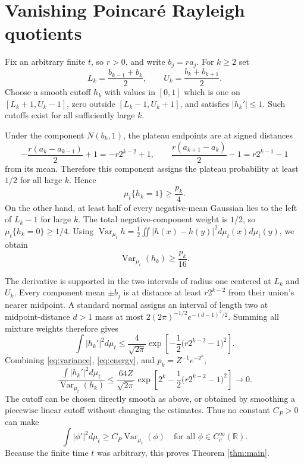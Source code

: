 \documentclass[10pt]{article}
\newcommand{\R}{\mathbb R}
\newcommand{\Var}{\operatorname{Var}}
\begin{document}
\section{Vanishing Poincar\'e Rayleigh quotients}
Fix an arbitrary finite $t$, so $r>0$, and write $b_j=ra_j$.  For $k\ge2$ set
\[
 L_k=\frac{b_{k-1}+b_k}{2},\qquad
 U_k=\frac{b_k+b_{k+1}}2.
\]
Choose a smooth cutoff $h_k$ with values in $[0,1]$ which is one on
$[L_k+1,U_k-1]$, zero outside $[L_k-1,U_k+1]$, and satisfies
$|h_k'|\le1$.  Such cutoffs exist for all sufficiently large $k$.

Under the component $N(b_k,1)$, the plateau endpoints are at signed
distances
\[
 -\frac{r(a_k-a_{k-1})}{2}+1=-r2^{k-2}+1,\qquad
 \frac{r(a_{k+1}-a_k)}2-1=r2^{k-1}-1
\]
from its mean.  Therefore this component assigns the plateau probability at
least $1/2$ for all large $k$.  Hence
\[
 \mu_t\{h_k=1\}\ge\frac{p_k}{4}.
\]
On the other hand, at least half of every negative-mean Gaussian lies to the
left of $L_k-1$ for large $k$.  The total negative-component weight is $1/2$,
so $\mu_t\{h_k=0\}\ge1/4$.  Using
$\Var_{\mu_t}h=\frac12\iint|h(x)-h(y)|^2d\mu_t(x)d\mu_t(y)$, we obtain
\begin{equation}\label{eq:variance}
 \Var_{\mu_t}(h_k)\ge\frac{p_k}{16}.
\end{equation}

The derivative is supported in the two intervals of radius one centered at
$L_k$ and $U_k$.  Every component mean $\pm b_j$ is at distance at least
$r2^{k-2}$ from their union's nearer midpoint.  A standard normal assigns an
interval of length two at midpoint-distance $d>1$ mass at most
$2(2\pi)^{-1/2}e^{-(d-1)^2/2}$.  Summing all mixture weights therefore gives
\begin{equation}\label{eq:energy}
 \int|h_k'|^2d\mu_t
 \le \frac4{\sqrt{2\pi}}
       \exp\!\left[-\frac12\bigl(r2^{k-2}-1\bigr)^2\right].
\end{equation}
Combining \eqref{eq:variance}, \eqref{eq:energy}, and
$p_k=Z^{-1}e^{-2^k}$,
\begin{equation}\label{eq:rayleigh}
 \frac{\int|h_k'|^2d\mu_t}{\Var_{\mu_t}(h_k)}
 \le \frac{64Z}{\sqrt{2\pi}}
 \exp\!\left[2^k-\frac12\bigl(r2^{k-2}-1\bigr)^2\right]
 \longrightarrow0.
\end{equation}
The cutoff can be chosen directly smooth as above, or obtained by smoothing
a piecewise linear cutoff without changing the estimates.  Thus no constant
$C_P>0$ can make
\[
 \int|\phi'|^2d\mu_t\ge C_P\Var_{\mu_t}(\phi)
 \quad\text{for all }\phi\in C_c^\infty(\R).
\]
Because the finite time $t$ was arbitrary, this proves Theorem
\ref{thm:main}.
\end{document}
